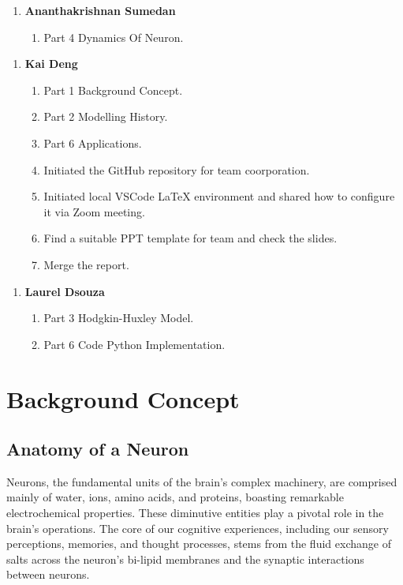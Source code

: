 \documentclass[12pt,a4paper]{report}
\begin{document}
\begin{enumerate}
    \item[] \textbf{Ananthakrishnan Sumedan}
    \begin{enumerate}
        \item Part 4 Dynamics Of Neuron.   
    \end{enumerate}
\end{enumerate}


\begin{enumerate}
    \item[] \textbf{Kai Deng}
    \begin{enumerate}
        \item Part 1 Background Concept. 
        \item Part 2 Modelling History.
        \item Part 6 Applications.
        \item Initiated the GitHub repository for team coorporation.
        \item Initiated local VSCode LaTeX environment and shared how to configure it via Zoom meeting.
        \item Find a suitable PPT template for team and check the slides.
        \item Merge the report.
    \end{enumerate}
\end{enumerate}

\begin{enumerate}
    \item[] \textbf{Laurel Dsouza}
    \begin{enumerate}
        \item Part 3 Hodgkin-Huxley Model.
        \item Part 6 Code Python Implementation.
    \end{enumerate}
\end{enumerate}




\clearpage

\chapter{Background Concept}
\section{Anatomy of a Neuron}
Neurons, the fundamental units of the brain's complex machinery, are comprised mainly of water, ions, amino acids, and proteins, boasting remarkable electrochemical properties. These diminutive entities play a pivotal role in the brain's operations. The core of our cognitive experiences, including our sensory perceptions, memories, and thought processes, stems from the fluid exchange of salts across the neuron's bi-lipid membranes and the synaptic interactions between neurons.
\end{document}
